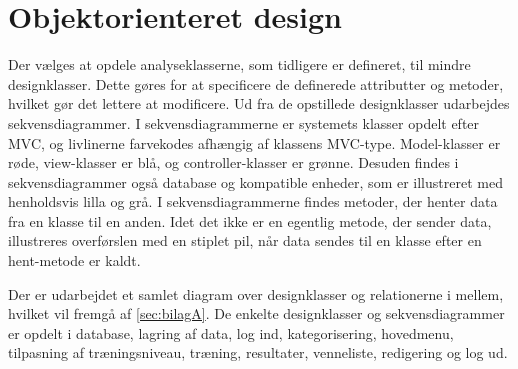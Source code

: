 \section{Objektorienteret design}
Der vælges at opdele analyseklasserne, som tidligere er defineret, til mindre designklasser. Dette gøres for at specificere de definerede attributter og metoder, hvilket gør det lettere at modificere. Ud fra de opstillede designklasser udarbejdes sekvensdiagrammer. I sekvensdiagrammerne er systemets klasser opdelt efter MVC, og livlinerne farvekodes afhængig af klassens MVC-type. Model-klasser er røde, view-klasser er blå, og controller-klasser er grønne. Desuden findes i sekvensdiagrammer også database og kompatible enheder, som er illustreret med henholdsvis lilla og grå. I sekvensdiagrammerne findes metoder, der henter data fra en klasse til en anden. Idet det ikke er en egentlig metode, der sender data, illustreres overførslen med en stiplet pil, når data sendes til en klasse efter en hent-metode er kaldt. 

Der er udarbejdet et samlet diagram over designklasser og relationerne i mellem, hvilket vil fremgå af \autoref{sec:bilagA}. De enkelte designklasser og sekvensdiagrammer er opdelt i database, lagring af data, log ind, kategorisering, hovedmenu, tilpasning af træningsniveau, træning, resultater, venneliste, redigering og log ud. 
